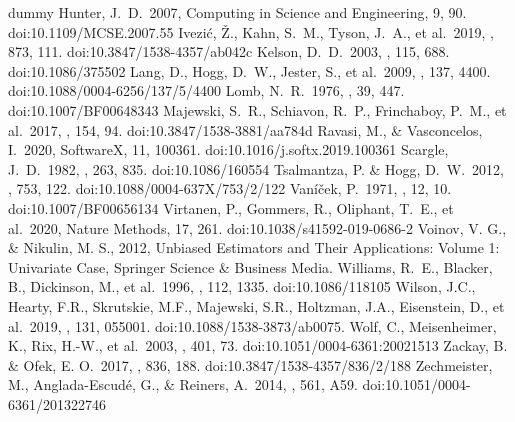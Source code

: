 \documentclass[modern, linenumbers]{aastex631}
\begin{document}
\begin{thebibliography}{dummy}
 Hunter, J.~D.\ 2007, Computing in Science and Engineering, 9, 90. doi:10.1109/MCSE.2007.55
 Ivezi{\'c}, {\v{Z}}., Kahn, S.~M., Tyson, J.~A., et al.\ 2019, \apj, 873, 111. doi:10.3847/1538-4357/ab042c
 Kelson, D.~D.\ 2003, \pasp, 115, 688. doi:10.1086/375502
 Lang, D., Hogg, D.~W., Jester, S., et al.\ 2009, \aj, 137, 4400. doi:10.1088/0004-6256/137/5/4400
 Lomb, N.~R.\ 1976, \apss, 39, 447. doi:10.1007/BF00648343
 Majewski, S.~R., Schiavon, R.~P., Frinchaboy, P.~M., et al.\ 2017, \aj, 154, 94. doi:10.3847/1538-3881/aa784d
 Ravasi, M., \& Vasconcelos, I.\ 2020, SoftwareX, 11, 100361. doi:10.1016/j.softx.2019.100361
 Scargle, J.~D.\ 1982, \apj, 263, 835. doi:10.1086/160554
 Tsalmantza, P. \& Hogg, D.~W.\ 2012, \apj, 753, 122. doi:10.1088/0004-637X/753/2/122
 Vaní{\v{c}}ek, P.\ 1971, \apss, 12, 10. doi:10.1007/BF00656134
 Virtanen, P., Gommers, R., Oliphant, T.~E., et al.\ 2020, Nature Methods, 17, 261. doi:10.1038/s41592-019-0686-2
 Voinov, V. G., \& Nikulin, M. S., 2012, Unbiased Estimators and Their Applications: Volume 1: Univariate Case, Springer Science \& Business Media.
 Williams, R.~E., Blacker, B., Dickinson, M., et al.\ 1996, \aj, 112, 1335. doi:10.1086/118105
 Wilson, J.C., Hearty, F.R., Skrutskie, M.F., Majewski, S.R., Holtzman, J.A., Eisenstein, D., et al.\ 2019, \pasp, 131, 055001. doi:10.1088/1538-3873/ab0075.
 Wolf, C., Meisenheimer, K., Rix, H.-W., et al.\ 2003, \aap, 401, 73. doi:10.1051/0004-6361:20021513
 Zackay, B. \& Ofek, E. O.\ 2017, \apj, 836, 188. doi:10.3847/1538-4357/836/2/188
 Zechmeister, M., Anglada-Escud{\'e}, G., \& Reiners, A.\ 2014, \aap, 561, A59. doi:10.1051/0004-6361/201322746

\end{thebibliography}
\end{document}
